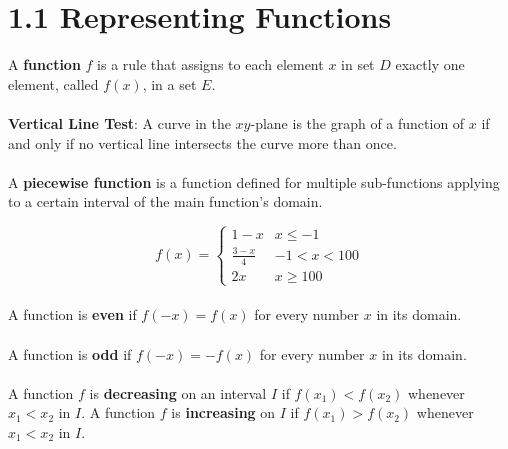 %
%

\section*{1.1 Representing Functions}

A \textbf{function} \(f\) is a rule that assigns to each element \(x\) in set \(D\) exactly one element, called \(f(x)\), in a set \(E\).
\\\\
\textbf{Vertical Line Test}: A curve in the \(xy\)-plane is the graph of a function of \(x\) if and only if no vertical line intersects the curve more than once.
\\\\
A \textbf{piecewise function} is a function defined for multiple sub-functions applying to a certain interval of the main function's domain.

\[ f(x)=
    \begin{cases} 
      1-x & x\leq -1 \\
      \frac{3-x}{4} & -1 < x < 100 \\
      2x & x\geq 100
   \end{cases}
\]
\\
A function is \textbf{even} if \(f(-x)=f(x)\) for every number \(x\) in its domain.
\\\\
A function is \textbf{odd} if \(f(-x)=-f(x)\) for every number \(x\) in its domain.
\\\\
A function \(f\) is \textbf{decreasing} on an interval \(I\) if \(f(x_1)<f(x_2)\) whenever \(x_1 < x_2\) in \(I\).
A function \(f\) is \textbf{increasing} on \(I\) if \(f(x_1)>f(x_2)\) whenever \(x_1<x_2\) in \(I\).
